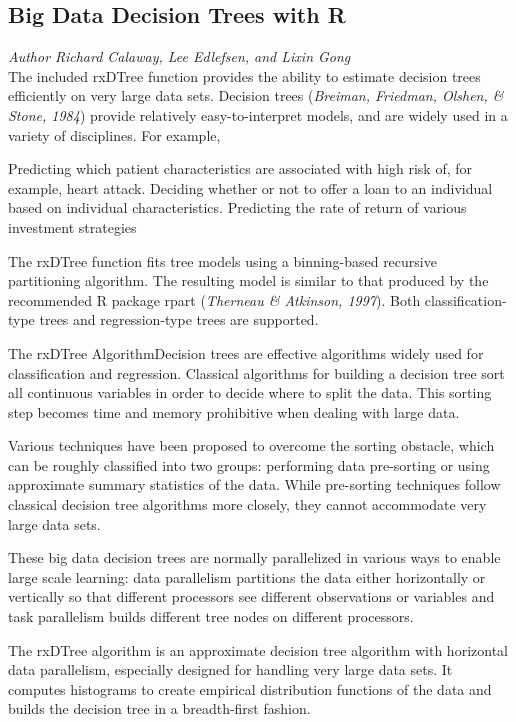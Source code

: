 \documentclass[RevoRtalk.tex]{subfiles}
\begin{document}
\subsection*{Big Data Decision Trees with R}
\textit{Author Richard Calaway, Lee Edlefsen, and Lixin Gong} \\
The included rxDTree function provides the ability to estimate decision trees efficiently on very large data sets. 
Decision trees (\textit{Breiman, Friedman, Olshen, \& Stone, 1984}) provide relatively easy-to-interpret models, and are widely used in a variety of disciplines.  For example,

Predicting which patient characteristics are associated with high risk of, for example, heart attack.
Deciding whether or not to offer a loan to an individual based on individual characteristics.
Predicting the rate of return of various investment strategies

The rxDTree function fits tree models using a binning-based recursive partitioning algorithm. The resulting model is similar to that produced by the recommended R package rpart (\textit{Therneau \& Atkinson, 1997}). Both classification-type trees and regression-type trees are supported.

The rxDTree AlgorithmDecision trees are effective algorithms widely used for classification and regression. Classical algorithms for building a decision tree sort all continuous variables in order to decide where to split the data. This sorting step becomes time and memory prohibitive when dealing with large data. 


Various techniques have been proposed to overcome the sorting obstacle, which can be roughly classified into two groups: performing data pre-sorting or using approximate summary statistics of the data. While pre-sorting techniques follow classical decision tree algorithms more closely, they cannot accommodate very large data sets. 

These big data decision trees are normally parallelized in various ways to enable large scale learning: data parallelism partitions the data either horizontally or vertically so that different processors see different observations or variables and task parallelism builds different tree nodes on different processors.


The rxDTree algorithm is an approximate decision tree algorithm with horizontal data parallelism, especially designed for handling very large data sets. It computes histograms to create empirical distribution functions of the data and builds the decision tree in a breadth-first fashion. 
\end{document}
